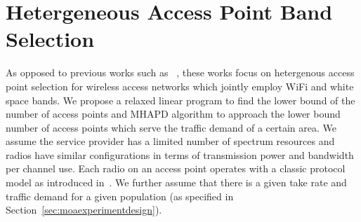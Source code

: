 



\section{Hetergeneous Access Point Band Selection}
\label{subsec:moaproblem}

As opposed to previous works such as
~\cite{franklin2007node,robinson2010deploying,si2010overview}, 
these works focus on hetergenous access point selection 
for wireless access networks which jointly employ WiFi and white space bands.
We propose a relaxed linear program to find the lower bound of the number of access points
and MHAPD algorithm  to approach the lower bound number of access points which serve
the traffic demand of a certain area. We assume the service provider has a limited number 
of spectrum resources and radios have similar configurations in terms of transmission power and bandwidth per 
channel use. Each radio on an access 
point operates with a classic protocol model as introduced in~\cite{gupta2000capacity}. 
We further assume that there is a given take rate and traffic demand for a given 
population (as specified in Section~\ref{sec:moaexperimentdesign}).

